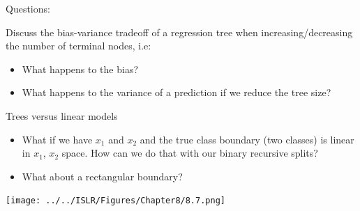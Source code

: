 \documentclass[10pt,ignorenonframetext,]{beamer}
\providecommand{\tightlist}{%
  \setlength{\itemsep}{0pt}\setlength{\parskip}{0pt}}
\begin{document}
\begin{frame}

\begin{block}{Questions:}

\vspace{2mm}

Discuss the bias-variance tradeoff of a regression tree when
increasing/decreasing the number of terminal nodes, i.e:

\begin{itemize}
\tightlist
\item
  What happens to the bias?
\item
  What happens to the variance of a prediction if we reduce the tree
  size?
\end{itemize}

\end{block}

\end{frame}

\begin{frame}{Trees versus linear models}

\begin{itemize}
\item
  What if we have \(x_1\) and \(x_2\) and the true class boundary (two
  classes) is linear in \(x_1\), \(x_2\) space. How can we do that with
  our binary recursive splits?
\item
  What about a rectangular boundary?
\end{itemize}

\centering
\texttt{[image: ../../ISLR/Figures/Chapter8/8.7.png]}

\end{frame}
\end{document}
